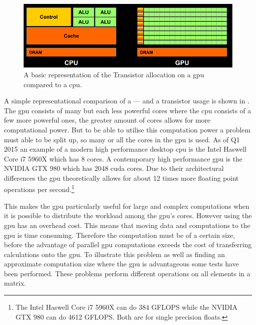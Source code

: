 \begin{figure}[h!]
\centering
 \includegraphics[width=1\textwidth]{figures/GPUCPUimage.png} %
\caption{A basic representation of the Transistor allocation on a \acrshort{gpu} compared to a \acrshort{cpu}. \citep{NvidiaCUDASeminar}}\label{image:gpucpuimage}
\vspace{-15pt}
\end{figure}

A simple representational comparison of a  --- and a  transistor usage is shown in .
The \acrshort{gpu} consists of many but each less powerful cores where the \acrshort{cpu} consists of a few more powerful ones, the greater amount of cores allows for more computational power.
But to be able to utilise this computation power a problem must able to be split up, so many or all the cores in the \acrshort{gpu} is used.
As of Q1 2015 an example of a modern high performance desktop \acrshort{cpu} is the Intel Haswell Core i7 5960X which has 8 cores. \citep{puget}
A contemporary high performance \acrshort{gpu} is the NVIDIA GTX 980 which has 2048 \gls{cuda} cores. \citep{techpowerup,gtx980}
Due to their architectural differences the \acrshort{gpu} theoretically allows for about 12 times more floating point operations per second.\footnote{The Intel Haswell Core i7 5960X can do 384 GFLOPS while the  NVIDIA GTX 980 can do 4612 GFLOPS. Both are for single precision floats.}

This makes the \acrshort{gpu} particularly useful for large and complex computations when it is possible to distribute the workload among the \acrshort{gpu}'s cores.
However using the \acrshort{gpu} has an overhead cost. 
This means that moving data and computations to the \acrshort{gpu} is time consuming.
Therefore the computation must be of a certain size, before the advantage of parallel \acrshort{gpu} computations exceeds the cost of transferring calculations onto the \acrshort{gpu}.
To illustrate this problem as well as finding an approximate computation size where the \acrshort{gpu} is advantageous some tests have been performed.
These problems perform different operations on all elements in a matrix. 

